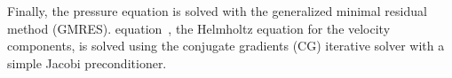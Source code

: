 \documentclass{sig-alternate}
\begin{document}
Finally, the pressure equation is solved with the generalized minimal residual 
method (GMRES). equation~, the Helmholtz equation for the 
velocity components, is solved using the conjugate gradients (CG) iterative solver with a simple Jacobi preconditioner.
\end{document}
